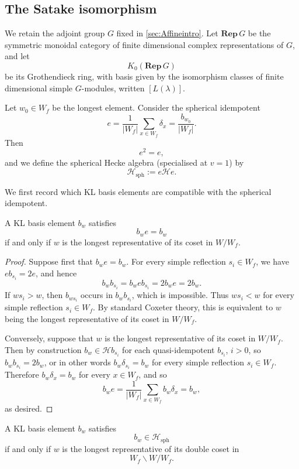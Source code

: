 \documentclass[a4paper,11pt]{amsart}
\newcommand{\Hecke}{\mc H}
\newcommand{\Rep}{\mathbf{Rep}\,}
\newcommand{\mc}{\mathcal}
\numberwithin{equation}{subsection}
\theoremstyle{definition}
\theoremstyle{remark}
\begin{document}
\subsection{The Satake isomorphism}\label{sec:satake}

We retain the adjoint group $G$ fixed in \autoref{sec:Affineintro}. Let
$\Rep G$ be the symmetric monoidal category of finite dimensional complex
representations of $G$, and let
\[
K_0(\Rep G)
\]
be its Grothendieck ring, with basis given by the isomorphism classes of finite
dimensional simple $G$-modules, written $[L(\lambda)]$.

Let $w_0\in W_f$ be the longest element. Consider the spherical idempotent
\[
e
=
\frac{1}{|W_f|}
\sum_{x\in W_f}\delta_x
=
\frac{b_{w_0}}{|W_f|}.
\]
Then
\[
e^2=e,
\]
and we define the spherical Hecke algebra (specialised at $v=1$) by
\[
\Hecke_{\mathrm{sph}}:=e\Hecke e.
\]

We first record which KL basis elements are compatible with the spherical
idempotent.

\begin{Lemma}\label{lem:longestrepiff}
A KL basis element $b_w$ satisfies
\[
b_we=b_w
\]
if and only if $w$ is the longest representative of its coset in $W/W_f$.
\end{Lemma}

\begin{proof}
Suppose first that \(b_we=b_w\). For every simple reflection \(s_i\in W_f\),
we have \(eb_{s_i}=2e\), and hence
\[
b_wb_{s_i}=b_web_{s_i}=2b_we=2b_w.
\]
If \(ws_i>w\), then \(b_{ws_i}\) occurs in \(b_wb_{s_i}\), which is impossible.
Thus \(ws_i<w\) for every simple reflection \(s_i\in W_f\). By standard
Coxeter theory, this is equivalent to \(w\) being the longest representative
of its coset in \(W/W_f\).

Conversely, suppose that \(w\) is the longest representative of its coset in
\(W/W_f\). Then by construction $b_w\in \Hecke b_{s_i}$ for each quasi-idempotent $b_{s_i}$, $i>0$, so
\(b_wb_{s_i}=2b_w\), or in other words
\(b_w\delta_{s_i}=b_w\) for every simple reflection \(s_i\in W_f\). Therefore
\(b_w\delta_x=b_w\) for every \(x\in W_f\), and so
\[
b_we
=
\frac{1}{|W_f|}
\sum_{x\in W_f} b_w\delta_x
=
b_w,
\]
as desired.
\end{proof}

\begin{Lemma}\label{L:TwoSided}
A KL basis element $b_w$ satisfies
\[
b_w\in \Hecke_{\mathrm{sph}}
\]
if and only if $w$ is the longest representative of its double coset in
\[
W_f\backslash W/W_f.
\]
\end{Lemma}
\end{document}

